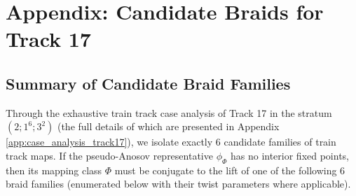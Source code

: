 \chapter[Appendix: Candidate Braids for Track 17]{Appendix: Candidate Braids for Track 17}
\label{app:candidate_braids_track_17}

\section{Summary of Candidate Braid Families}
\label{sec:summary_track17_braids}

Through the exhaustive train track case analysis of Track 17 in the stratum $(2;1^6;3^2)$ (the full details of which are presented in Appendix \ref{app:case_analysis_track17}), we isolate exactly 6 candidate families of train track maps. If the pseudo-Anosov representative $\phi_\Phi$ has no interior fixed points, then its mapping class $\Phi$ must be conjugate to the lift of one of the following 6 braid families (enumerated below with their twist parameters where applicable).

